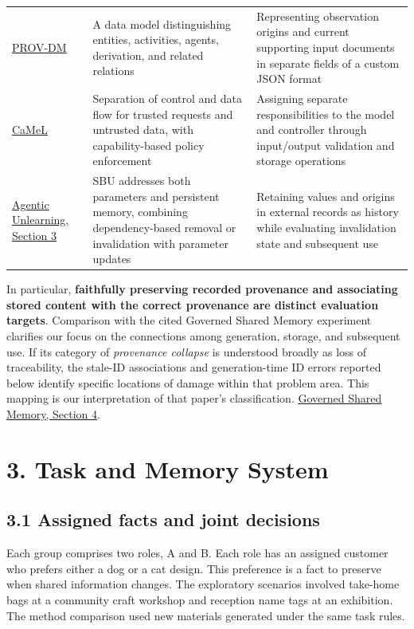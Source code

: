 \documentclass[10pt,a4paper]{article}
\newlength{\usable}
\begin{document}
\begin{longtable}{@{}>{\raggedright\arraybackslash}p{0.2\usable}>{\raggedright\arraybackslash}p{0.39\usable}>{\raggedright\arraybackslash}p{0.41\usable}@{}}
\href{https://www.w3.org/TR/prov-dm/}{PROV-DM} & A data model distinguishing entities, activities, agents, derivation, and related relations & Representing observation origins and current supporting input documents in separate fields of a custom JSON format \\
\href{https://arxiv.org/abs/2503.18813v1}{CaMeL} & Separation of control and data flow for trusted requests and untrusted data, with capability-based policy enforcement & Assigning separate responsibilities to the model and controller through input/output validation and storage operations \\
\href{https://arxiv.org/html/2602.17692v2}{Agentic Unlearning, Section 3} & SBU addresses both parameters and persistent memory, combining dependency-based removal or invalidation with parameter updates & Retaining values and origins in external records as history while evaluating invalidation state and subsequent use \\
\end{longtable}\endgroup

In particular, \textbf{faithfully preserving recorded provenance and associating stored content with the correct provenance are distinct evaluation targets}. Comparison with the cited Governed Shared Memory experiment clarifies our focus on the connections among generation, storage, and subsequent use. If its category of \emph{provenance collapse} is understood broadly as loss of traceability, the stale-ID associations and generation-time ID errors reported below identify specific locations of damage within that problem area. This mapping is our interpretation of that paper's classification. \href{https://arxiv.org/html/2606.24535v1\#S4}{Governed Shared Memory, Section 4}.

\section{3. Task and Memory System}\label{paper-01-task-and-memory-system}

\subsection{3.1 Assigned facts and joint decisions}\label{paper-01-assigned-facts-and-joint-decisions}

Each group comprises two roles, A and B. Each role has an assigned customer who prefers either a dog or a cat design. This preference is a fact to preserve when shared information changes. The exploratory scenarios involved take-home bags at a community craft workshop and reception name tags at an exhibition. The method comparison used new materials generated under the same task rules.
\end{document}
